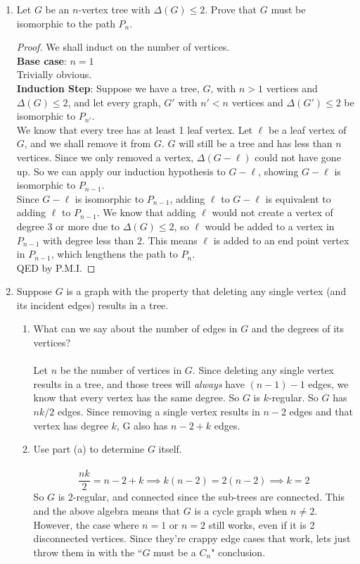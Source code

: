 \documentclass[12pt]{article}
\begin{document}
\begin{enumerate}
\item Let $G$ be an $n$-vertex tree with $\Delta(G) \leq 2$. Prove that $G$ must be isomorphic to the path $P_n$. 
\begin{proof}
	We shall induct on the number of vertices.\\
	\textbf{Base case}: $n=1$\\
	Trivially obvious.\\
	\textbf{Induction Step}: Suppose we have a tree, $G$, with $n>1$ vertices and $\Delta(G) \leq 2$, and let every graph, $G'$ with $n'<n$ vertices and $\Delta(G') \leq 2$ be isomorphic to $P_{n'}$.\\
	We know that every tree has at least 1 leaf vertex. Let $\ell$ be a leaf vertex of $G$, and we shall remove it from $G$. $G$ will still be a tree and has less than $n$ vertices. Since we only removed a vertex, $\Delta(G-\ell)$ could not have gone up. So we can apply our induction hypothesis to $G-\ell$, showing $G-\ell$ is isomorphic to $P_{n-1}$.\\
	Since $G-\ell$ is isomorphic to $P_{n-1}$, adding $\ell$ to $G-\ell$ is equivalent to adding $\ell$ to $P_{n-1}$. We know that adding $\ell$ would not create a vertex of degree 3 or more due to $\Delta(G) \leq 2$, so $\ell$ would be added to a vertex in $P_{n-1}$ with degree less than 2. This means $\ell$ is added to an end point vertex in $P_{n-1}$, which lengthens the path to $P_n$.\\
	QED by P.M.I.
\end{proof}
\medskip

\item Suppose $G$ is a graph with the property that deleting any single vertex (and its incident edges) results in a tree.
\begin{enumerate}
\item What can we say about the number of edges in $G$ and the degrees of its vertices?\\\\
Let $n$ be the number of vertices in $G$. Since deleting any single vertex results in a tree, and those trees will \emph{always} have $(n-1)-1$ edges, we know that every vertex has the same degree. So $G$ is $k$-regular. So $G$ has $nk/2$ edges. Since removing a single vertex results in $n-2$ edges and that vertex has degree $k$, G also has $n-2+k$ edges. 

\item Use part (a) to determine $G$ itself.\\\\
\[\frac{nk}{2}=n-2+k \implies k(n-2)=2(n-2) \implies k=2\]
So $G$ is 2-regular, and connected since the sub-trees are connected. This and the above algebra means that $G$ is a cycle graph when $n\neq2$. However, the case where $n=1$ or $n=2$ still works, even if it is 2 disconnected vertices. Since they're crappy edge cases that work, lets just throw them in with the ``$G$ must be a $C_n$" conclusion. 
\end{enumerate}



\end{enumerate}
\end{document}
